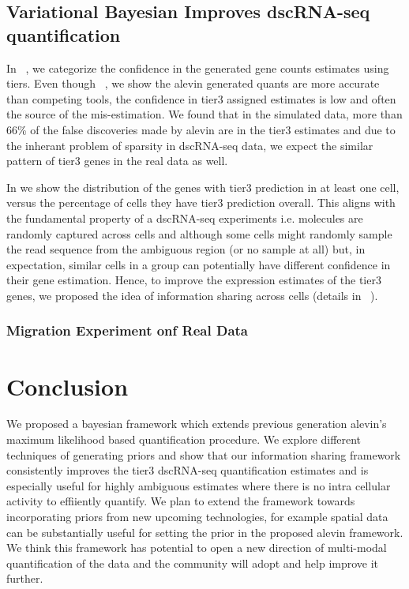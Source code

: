 \subsection{Variational Bayesian Improves dscRNA-seq quantification}
In ~, we categorize the confidence in the generated gene counts estimates using tiers. 
Even though ~, we show the alevin generated quants are more accurate
than competing tools, the confidence in tier3 assigned estimates is low and often the source of 
the mis-estimation. We found that in the simulated data, more than 66\% of the false discoveries made 
by alevin are in the tier3 estimates and due to the inherant problem of sparsity in dscRNA-seq data,
we expect the similar pattern of tier3 genes in the real data as well. 

In  we show the distribution of the genes with tier3 prediction in at least one cell,
versus the percentage of cells they have tier3 prediction overall. This aligns with the fundamental 
property of a dscRNA-seq experiments i.e. molecules are randomly captured across cells and although
some cells might randomly sample the read sequence from the ambiguous region (or no sample at all) but, 
in expectation, similar cells in a group can potentially have different confidence in their gene
estimation. Hence, to improve the expression estimates of the tier3 genes, we proposed the idea of 
information sharing across cells (details in ~).

\subsubsection{Migration Experiment onf Real Data}


\section{Conclusion}
We proposed a bayesian framework which extends previous generation alevin's maximum likelihood based 
quantification procedure. We explore different techniques of generating priors and show that our 
information sharing framework consistently improves the tier3 dscRNA-seq quantification estimates and 
is especially useful for highly ambiguous estimates where there is no intra cellular activity to 
effiiently quantify. We plan to extend the framework towards incorporating priors from new upcoming 
technologies, for example spatial data can be substantially useful for setting the prior in the proposed 
alevin framework.  We think this framework has potential to open a new direction of multi-modal 
quantification of the data and the community will adopt and help improve it further.
